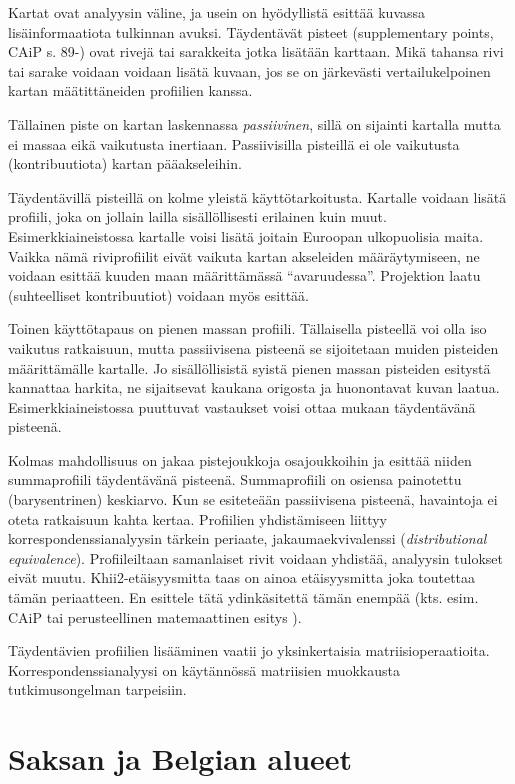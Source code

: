 \documentclass[
  finnish,
]{book}
\begin{document}
Kartat ovat analyysin väline, ja usein on hyödyllistä esittää kuvassa
lisäinformaatiota tulkinnan avuksi. Täydentävät pisteet (supplementary points,
CAiP s. 89-) ovat rivejä tai sarakkeita jotka lisätään karttaan. Mikä tahansa
rivi tai sarake voidaan voidaan lisätä kuvaan, jos se on järkevästi vertailukelpoinen
kartan määtittäneiden profiilien kanssa.

Tällainen piste on kartan laskennassa \emph{passiivinen}, sillä on sijainti kartalla
mutta ei massaa eikä vaikutusta inertiaan. Passiivisilla pisteillä ei ole vaikutusta
(kontribuutiota) kartan pääakseleihin.

Täydentävillä pisteillä on kolme yleistä käyttötarkoitusta. Kartalle voidaan lisätä
profiili, joka on jollain lailla sisällöllisesti erilainen kuin muut. Esimerkkiaineistossa
kartalle voisi lisätä joitain Euroopan ulkopuolisia maita. Vaikka nämä riviprofiilit
eivät vaikuta kartan akseleiden määräytymiseen, ne voidaan esittää kuuden maan
määrittämässä ``avaruudessa''. Projektion laatu (suhteelliset kontribuutiot) voidaan myös
esittää.

Toinen käyttötapaus on pienen massan profiili. Tällaisella pisteellä voi olla iso
vaikutus ratkaisuun, mutta passiivisena pisteenä se sijoitetaan muiden pisteiden
määrittämälle kartalle. Jo sisällöllisistä syistä pienen massan pisteiden esitystä
kannattaa harkita, ne sijaitsevat kaukana origosta ja huonontavat kuvan laatua.
Esimerkkiaineistossa puuttuvat vastaukset voisi ottaa mukaan täydentävänä pisteenä.

Kolmas mahdollisuus on jakaa pistejoukkoja osajoukkoihin ja esittää niiden
summaprofiili täydentävänä pisteenä. Summaprofiili on osiensa painotettu
(barysentrinen) keskiarvo. Kun se esiteteään passiivisena pisteenä, havaintoja ei
oteta ratkaisuun kahta kertaa. Profiilien yhdistämiseen liittyy
korrespondenssianalyysin tärkein periaate, jakaumaekvivalenssi (\emph{distributional
equivalence}). Profiileiltaan samanlaiset rivit voidaan yhdistää, analyysin tulokset
eivät muutu. Khii2-etäisyysmitta taas on ainoa etäisyysmitta joka toutettaa tämän
periaatteen. En esittele tätä ydinkäsitettä tämän enempää (kts. esim. CAiP tai
perusteellinen matemaattinen esitys \citep{RefWorks:doc:5a857a43e4b0ed2d44664d75}).

Täydentävien profiilien lisääminen vaatii jo yksinkertaisia matriisioperaatioita.
Korrespondenssianalyysi on käytännössä matriisien muokkausta tutkimusongelman
tarpeisiin.

\hypertarget{saksan-ja-belgian-alueet}{%
\section{Saksan ja Belgian alueet}\label{saksan-ja-belgian-alueet}}
\end{document}
